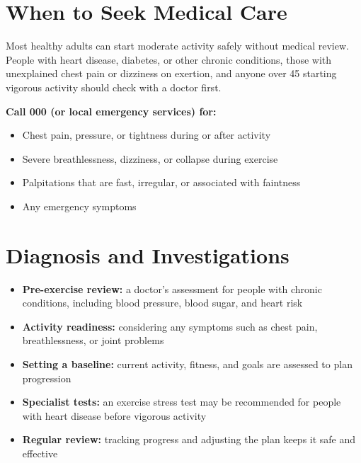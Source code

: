 \section*{When to Seek Medical Care}
Most healthy adults can start moderate activity safely without medical review. People with heart disease, diabetes, or other chronic conditions, those with unexplained chest pain or dizziness on exertion, and anyone over 45 starting vigorous activity should check with a doctor first.

\textbf{Call 000 (or local emergency services) for:}
\begin{itemize}
    \item Chest pain, pressure, or tightness during or after activity
    \item Severe breathlessness, dizziness, or collapse during exercise
    \item Palpitations that are fast, irregular, or associated with faintness
    \item Any emergency symptoms
\end{itemize}

\section*{Diagnosis and Investigations}
\begin{itemize}
    \item \textbf{Pre-exercise review:} a doctor's assessment for people with chronic conditions, including blood pressure, blood sugar, and heart risk
    \item \textbf{Activity readiness:} considering any symptoms such as chest pain, breathlessness, or joint problems
    \item \textbf{Setting a baseline:} current activity, fitness, and goals are assessed to plan progression
    \item \textbf{Specialist tests:} an exercise stress test may be recommended for people with heart disease before vigorous activity
    \item \textbf{Regular review:} tracking progress and adjusting the plan keeps it safe and effective
\end{itemize}

